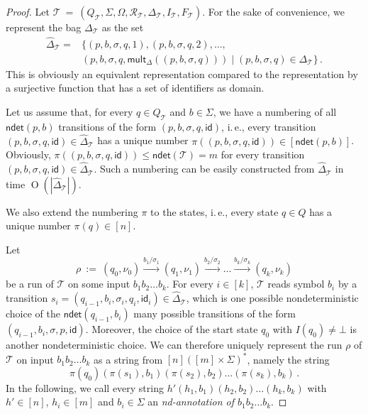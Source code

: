 \documentclass[
a4paper
]{article}
\theoremstyle{plain}
\theoremstyle{definition}
\theoremstyle{remark}
\newcommand{\mult}[2]{\operatorname{mult}_{#1}(#2)}
\newcommand{\Reg}{\mathcal{R}}
\newcommand{\ndetbf}[1]{\textsf{ndet}(#1)}
\newcommand{\nsst}{\mathcal{T}}
\newcommand{\sst}{\mathcal{T}}
\renewcommand{\operatorname}[1]{\textsf{#1}}
\DeclareMathOperator{\bigo}{O}
\begin{document}
\begin{proof}
Let $\sst \ = \ (Q_{\sst}, \Sigma, \Omega,  \Reg_{\sst}, \Delta_{\sst}, I_{\sst}, F_{\sst})$. For the sake of convenience, we represent the bag $\Delta_{\sst}$ as the set 
\begin{align*}
\widehat{\Delta}_{\sst} = &\{(p, b, \sigma, q, 1), (p, b, \sigma, q, 2), \ldots, \\
&(p, b, \sigma, q, \mult{\Delta}{(p, b, \sigma, q)}) \mid (p, b, \sigma, q) \in \Delta_{\sst}\}\,.
\end{align*} 
This is obviously an equivalent representation compared to the representation by a surjective function that has a set of identifiers as domain.

Let us assume that, for every $q \in Q_{\sst}$ and $b \in \Sigma$, we have a numbering of all $\ndetbf{p, b}$ transitions of the form $(p, b, \sigma, q, \textsf{id})$, i.\,e., every transition $(p, b, \sigma, q, \textsf{id}) \in \widehat{\Delta}_{\sst}$ has a unique number $\pi((p, b, \sigma, q, \textsf{id})) \in [\ndetbf{p, b}]$. Obviously, $\pi((p, b, \sigma, q, \textsf{id})) \leq \ndetbf{\nsst} = m$ for every transition $(p, b, \sigma, q, \textsf{id}) \in \widehat{\Delta}_{\sst}$. Such a numbering can be easily constructed from $\widehat{\Delta}_{\sst}$ in time $\bigo(|\widehat{\Delta}_{\sst}|)$.

We also extend the numbering $\pi$ to the states, i.\,e., every state $q \in Q$ has a unique number $\pi(q) \in [n]$. 

Let 
\begin{equation*}
\rho \ := \ (q_0, \nu_0) \xrightarrow{b_1/\sigma_1} (q_1, \nu_1) \xrightarrow{b_2 /\sigma_2} \ldots \xrightarrow{b_k/\sigma_{k}} (q_{k}, \nu_k)
\end{equation*}
be a run of $\sst$ on some input $b_1 b_2 \ldots b_k$. For every $i \in [k]$, $\sst$ reads symbol $b_i$ by a transition $s_i = (q_{i-1}, b_i, \sigma_i, q_i, \textsf{id}_i) \in \widehat{\Delta}_{\sst}$, which is one possible nondeterministic choice of the $\ndetbf{q_{i-1}, b_i}$ many possible transitions of the form $(q_{i-1}, b_i, \sigma, p, \textsf{id})$. Moreover, the choice of the start state $q_0$ with $I(q_0) \neq \bot$ is another nondeterministic choice. We can therefore uniquely represent the run $\rho$ of $\sst$ on input $b_1 b_2 \ldots b_k$ as a string from $[n] ([m] \times \Sigma)^*$, namely the string 
\begin{equation*}
\pi(q_0) (\pi(s_1), b_1) (\pi(s_2), b_2) \ldots (\pi(s_k), b_k)\,.
\end{equation*}
In the following, we call every string $h' (h_1, b_1) (h_2, b_2) \ldots (h_k, b_k)$ with $h' \in [n]$, $h_i \in [m]$ and $b_i \in \Sigma$ an \emph{nd-annotation of $b_1 b_2 \ldots b_k$}.


\end{proof}
\end{document}
